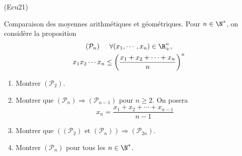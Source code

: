 \begin{tiny}(Ecu21)\end{tiny} Comparaison des moyennes arithmétiques et géométriques.\newline
Pour $n\in \N^*$, on considère la proposition 
\begin{multline*}
(\mathcal{P}_n)\hspace{0.5cm}
\forall (x_1,\cdots,x_n)\in \R_{+}^{n}, \\
x_1x_2\cdots x_n \leq \left( \frac{x_1+x_2+\cdots+x_n}{n}\right)^n 
\end{multline*}
\begin{enumerate}
  \item Montrer $(\mathcal{P}_2)$.
  \item Montrer que $(\mathcal{P}_n)\Rightarrow (\mathcal{P}_{n-1})$ pour $n\geq 2$. On posera 
  \begin{displaymath}
    x_n = \frac{x_1+x_2+\cdots +x_{n-1}}{n-1}
  \end{displaymath}
  \item Montrer que $\left((\mathcal{P}_{2}) \text{ et } (\mathcal{P}_{n})\right) \Rightarrow (\mathcal{P}_{2n})$.
  \item Montrer $(\mathcal{P}_{n})$ pour tous les $n\in \N^*$.
\end{enumerate}
